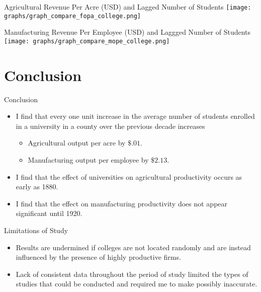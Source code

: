 \documentclass{beamer}
\begin{document}
\begin{frame}{Agricultural Revenue Per Acre (USD) and Lagged Number of Students}
\texttt{[image: graphs/graph\_compare\_fopa\_college.png]}
\end{frame}

\begin{frame}{Manufacturing Revenue Per Employee (USD) and Laggged Number of Students}
\texttt{[image: graphs/graph\_compare\_mope\_college.png]}
\end{frame}

\section{Conclusion}

\begin{frame}{Conclusion}
\begin{itemize}
\item I find that every one unit increase in the average number of students enrolled in a university in a county over the previous decade increases 
\begin{itemize}
\item Agricultural output per acre by $\$.01$. 
\item Manufacturing output per employee by $\$2.13$.
\end{itemize}
\item I find that the effect of universities on agricultural productivity occurs as early as 1880.
\item I find that the effect on manufacturing productivity does not appear significant until 1920.
\end{itemize}
\end{frame}

\begin{frame}{Limitations of Study}
\begin{itemize}
\item Results are undermined if colleges are not located randomly and are instead influenced by the presence of highly productive firms.
\item Lack of consistent data throughout the period of study limited the types of studies that could be conducted and required me to make possibly inaccurate.
\end{itemize}
\end{frame}
\end{document}
